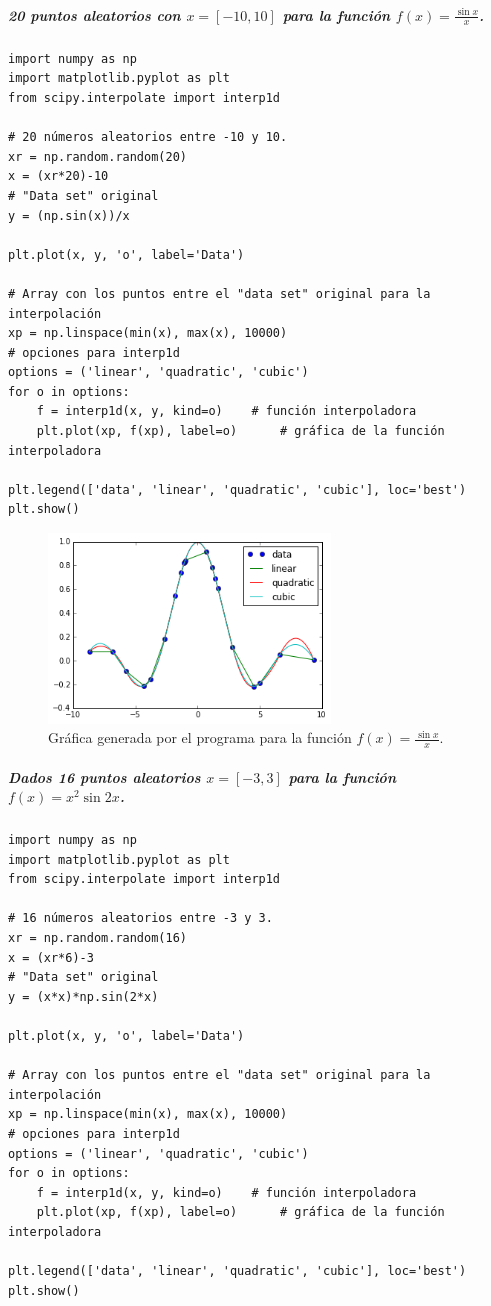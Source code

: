 \documentclass[12pt]{article}
\begin{document}
\subparagraph*{20 puntos aleatorios con $x=[-10,10]$ para la función $f(x)= \displaystyle \frac{\sin{x}}{x}$.}
\begin{verbatim}
import numpy as np
import matplotlib.pyplot as plt
from scipy.interpolate import interp1d

# 20 números aleatorios entre -10 y 10.
xr = np.random.random(20)
x = (xr*20)-10
# "Data set" original
y = (np.sin(x))/x

plt.plot(x, y, 'o', label='Data')

# Array con los puntos entre el "data set" original para la interpolación
xp = np.linspace(min(x), max(x), 10000)
# opciones para interp1d
options = ('linear', 'quadratic', 'cubic')
for o in options:
    f = interp1d(x, y, kind=o)    # función interpoladora
    plt.plot(xp, f(xp), label=o)      # gráfica de la función interpoladora
    
plt.legend(['data', 'linear', 'quadratic', 'cubic'], loc='best')
plt.show()
\end{verbatim}

\begin{figure}[H]
\centering
\includegraphics[width=7.5cm]{4}
\caption{Gráfica generada por el programa para la función $f(x)= \displaystyle \frac{\sin{x}}{x}$.}
\end{figure}

\subparagraph*{Dados 16 puntos aleatorios $x=[-3,3]$ para la función $f(x)= \displaystyle x^2\sin{2x}$.}
\begin{verbatim}
import numpy as np
import matplotlib.pyplot as plt
from scipy.interpolate import interp1d

# 16 números aleatorios entre -3 y 3.
xr = np.random.random(16)
x = (xr*6)-3
# "Data set" original
y = (x*x)*np.sin(2*x)

plt.plot(x, y, 'o', label='Data')

# Array con los puntos entre el "data set" original para la interpolación
xp = np.linspace(min(x), max(x), 10000)
# opciones para interp1d
options = ('linear', 'quadratic', 'cubic')
for o in options:
    f = interp1d(x, y, kind=o)    # función interpoladora
    plt.plot(xp, f(xp), label=o)      # gráfica de la función interpoladora
    
plt.legend(['data', 'linear', 'quadratic', 'cubic'], loc='best')
plt.show()
\end{verbatim}
\end{document}
